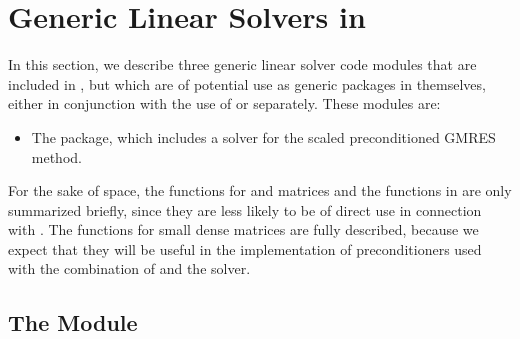\chapter{Generic Linear Solvers in {\sundials}}\label{s:gen_linsolv}
In this section, we describe three generic linear solver code modules that 
are included in {\cvodes}, but which are of potential use as generic packages in
themselves, either in conjunction with the use of {\cvodes} or separately.
These modules are:
\begin{itemize}
\item The {\spgmr} package, which includes a solver for the scaled
      preconditioned GMRES method.
\end{itemize}

For the sake of space, the functions for  and
 matrices and the functions in {\spgmr} are only summarized
briefly, since they are less likely to be of direct use in connection
with {\cvodes}.  The functions for small dense matrices are fully
described, because we expect that they will be useful in the
implementation of preconditioners used with the combination of {\cvodes}
and the {\cvspgmr} solver.



\section{The {\spgmr} Module}\label{ss:spgmr}


